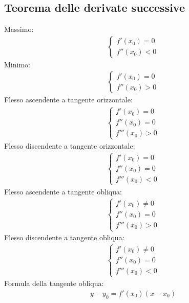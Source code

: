 \documentclass[a4paper]{article}
\begin{document}
	\subsection{Teorema delle derivate successive}
	Massimo:\\
	\begin{align*}
		\begin{cases}
			f'(x_0) = 0\\
			f''(x_0) < 0
		\end{cases}
	\end{align*}
	Minimo:\\
	\begin{align*}
		\begin{cases}
			f'(x_0) = 0\\
			f''(x_0) > 0
		\end{cases}
	\end{align*}
	Flesso ascendente a tangente orizzontale:\\
	\begin{align*}
		\begin{cases}
			f'(x_0) = 0\\
			f''(x_0) = 0\\
			f'''(x_0) > 0
		\end{cases}
	\end{align*}
	Flesso discendente a tangente orizzontale:\\
	\begin{align*}
		\begin{cases}
			f'(x_0) = 0\\
			f''(x_0) = 0\\
			f'''(x_0) < 0
		\end{cases}
	\end{align*}	
	Flesso ascendente a tangente obliqua:\\
	\begin{align*}
	\begin{cases}
	f'(x_0) \ne 0\\
	f''(x_0) = 0\\
	f'''(x_0) > 0
	\end{cases}
	\end{align*}	
	Flesso discendente a tangente obliqua:\\
	\begin{align*}
	\begin{cases}
	f'(x_0) \ne 0\\
	f''(x_0) = 0\\
	f'''(x_0) < 0
	\end{cases}
	\end{align*}	
	Formula della tangente obliqua:
	\begin{align*}
		y-y_0 = f'(x_0)(x-x_0)
	\end{align*}
	
\end{document}
